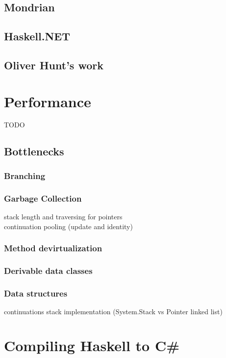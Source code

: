 \documentclass[en]{pracamgr}
\begin{document}
\section{Mondrian}
\cite{PerryMeijer}

\section{Haskell.NET}
\cite{Brazil}

\section{Oliver Hunt's work}
\cite{Hunt}

\chapter{Performance}\label{r:perf}

TODO

\section{Bottlenecks}
\subsection{Branching}
\subsection{Garbage Collection}
stack length and traversing for pointers \\
continuation pooling (update and identity)
\subsection{Method devirtualization}
\subsection{Derivable data classes}
\subsection{Data structures}
continuations stack implementation (System.Stack vs Pointer linked list) \\

\chapter{Compiling Haskell to C\#}\label{r:compiler}
\end{document}
